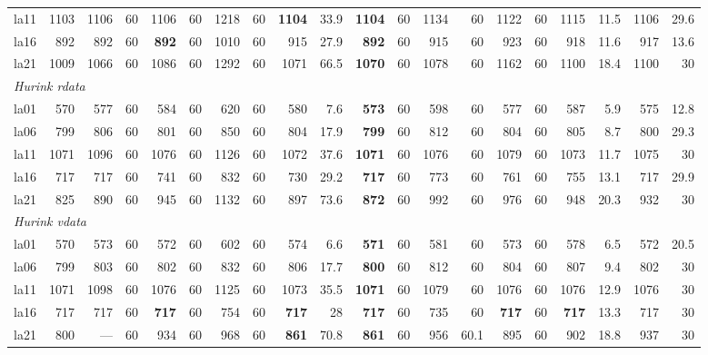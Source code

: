 \documentclass[conference]{IEEEtran}
\begin{document}
\begin{thebibliography}{25}
\begin{table}[tp]
\begin{tabular}{lr rr rr rr rr rr rr rr rr rr}
la11 & 1103 & 1106 & 60 & 1106 & 60 & 1218 & 60 & \textbf{1104} & 33.9 & \textbf{1104} & 60 & 1134 & 60 & 1122 & 60 & 1115 & 11.5 & 1106 & 29.6 \\
la16 & 892 & 892 & 60 & \textbf{892} & 60 & 1010 & 60 & 915 & 27.9 & \textbf{892} & 60 & 915 & 60 & 923 & 60 & 918 & 11.6 & 917 & 13.6 \\
la21 & 1009 & 1066 & 60 & 1086 & 60 & 1292 & 60 & 1071 & 66.5 & \textbf{1070} & 60 & 1078 & 60 & 1162 & 60 & 1100 & 18.4 & 1100 & 30 \\
\hline
\multicolumn{20}{l}{\emph{Hurink \emph{rdata}}} \\
la01 & 570 & 577 & 60 & 584 & 60 & 620 & 60 & 580 & 7.6 & \textbf{573} & 60 & 598 & 60 & 577 & 60 & 587 & 5.9 & 575 & 12.8 \\
la06 & 799 & 806 & 60 & 801 & 60 & 850 & 60 & 804 & 17.9 & \textbf{799} & 60 & 812 & 60 & 804 & 60 & 805 & 8.7 & 800 & 29.3 \\
la11 & 1071 & 1096 & 60 & 1076 & 60 & 1126 & 60 & 1072 & 37.6 & \textbf{1071} & 60 & 1076 & 60 & 1079 & 60 & 1073 & 11.7 & 1075 & 30 \\
la16 & 717 & 717 & 60 & 741 & 60 & 832 & 60 & 730 & 29.2 & \textbf{717} & 60 & 773 & 60 & 761 & 60 & 755 & 13.1 & 717 & 29.9 \\
la21 & 825 & 890 & 60 & 945 & 60 & 1132 & 60 & 897 & 73.6 & \textbf{872} & 60 & 992 & 60 & 976 & 60 & 948 & 20.3 & 932 & 30 \\
\hline
\multicolumn{20}{l}{\emph{Hurink \emph{vdata}}} \\
la01 & 570 & 573 & 60 & 572 & 60 & 602 & 60 & 574 & 6.6 & \textbf{571} & 60 & 581 & 60 & 573 & 60 & 578 & 6.5 & 572 & 20.5 \\
la06 & 799 & 803 & 60 & 802 & 60 & 832 & 60 & 806 & 17.7 & \textbf{800} & 60 & 812 & 60 & 804 & 60 & 807 & 9.4 & 802 & 30 \\
la11 & 1071 & 1098 & 60 & 1076 & 60 & 1125 & 60 & 1073 & 35.5 & \textbf{1071} & 60 & 1079 & 60 & 1076 & 60 & 1076 & 12.9 & 1076 & 30 \\
la16 & 717 & 717 & 60 & \textbf{717} & 60 & 754 & 60 & \textbf{717} & 28 & \textbf{717} & 60 & 735 & 60 & \textbf{717} & 60 & \textbf{717} & 13.3 & 717 & 30 \\
la21 & 800 & --- & 60 & 934 & 60 & 968 & 60 & \textbf{861} & 70.8 & \textbf{861} & 60 & 956 & 60.1 & 895 & 60 & 902 & 18.8 & 937 & 30 \\
\hline
\end{tabular}
\end{table}
\end{thebibliography}
\end{document}
